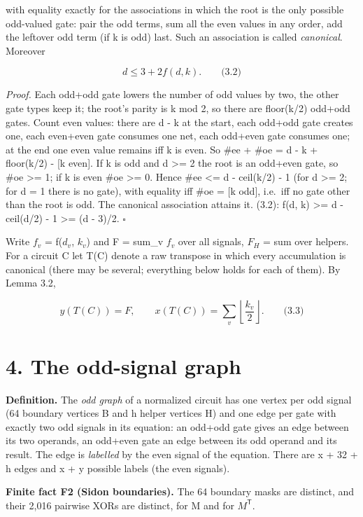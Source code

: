 with equality exactly for the associations in which the root is the only possible odd-valued gate: pair the odd terms, sum all the even values in any order, add the leftover odd term (if k is odd) last. Such an association is called \emph{canonical}. Moreover

\[
d\le3+2f(d,k).\qquad\text{(3.2)}
\]

\emph{Proof.} Each odd+odd gate lowers the number of odd values by two, the other gate types keep it; the root's parity is k mod 2, so there are floor(k/2) odd+odd gates. Count even values: there are d - k at the start, each odd+odd gate creates one, each even+even gate consumes one net, each odd+even gate consumes one; at the end one even value remains iff k is even. So \#ee + \#oe = d - k + floor(k/2) - {[}k even{]}. If k is odd and d \textgreater= 2 the root is an odd+even gate, so \#oe \textgreater= 1; if k is even \#oe \textgreater= 0. Hence \#ee \textless= d - ceil(k/2) - 1 (for d \textgreater= 2; for d = 1 there is no gate), with equality iff \#oe = {[}k odd{]}, i.e.~iff no gate other than the root is odd. The canonical association attains it. (3.2): f(d, k) \textgreater= d - ceil(d/2) - 1 \textgreater= (d - 3)/2. \(\square\)

Write \(f_v\) = f(\(d_v\), \(k_v\)) and F = sum\_v \(f_v\) over all signals, \(F_H\) = sum over helpers. For a circuit C let T(C) denote a raw transpose in which every accumulation is canonical (there may be several; everything below holds for each of them). By Lemma 3.2,

\[
y(T(C))=F,\qquad x(T(C))=\sum_v\left\lfloor\frac{k_v}{2}\right\rfloor.\qquad\text{(3.3)}
\]

\hypertarget{the-odd-signal-graph}{%
\section{4. The odd-signal graph}\label{the-odd-signal-graph}}

\textbf{Definition.} The \emph{odd graph} of a normalized circuit has one vertex per odd signal (64 boundary vertices B and h helper vertices H) and one edge per gate with exactly two odd signals in its equation: an odd+odd gate gives an edge between its two operands, an odd+even gate an edge between its odd operand and its result. The edge is \emph{labelled} by the even signal of the equation. There are x + 32 + h edges and x + y possible labels (the even signals).

\textbf{Finite fact F2 (Sidon boundaries).} The 64 boundary masks are distinct, and their 2,016 pairwise XORs are distinct, for M and for \(M^{\mathsf T}\).

